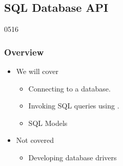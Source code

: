 %
%
%
%

\subsection{SQL Database API} \label{sql}

\begin{slide}{0516}\frametitle{Overview}
\begin{itemize}
\item We will cover
 \begin{itemize}
  \item Connecting to a database.
  \item Invoking SQL queries using .
  \item SQL Models
  \end{itemize}
  \item Not covered
    \begin{itemize}
    \item Developing database drivers
    \end{itemize}
\end{itemize}
\end{slide}



